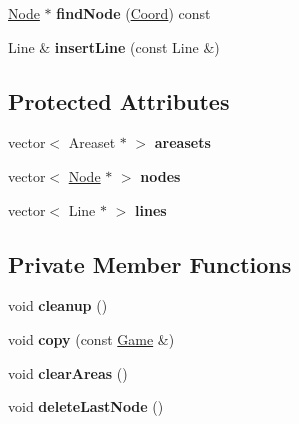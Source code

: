\begin{DoxyCompactItemize}
\item 
\hypertarget{classGame_a25d65e35ad5efbd14c4dbe4476bb5ec0}{\hyperlink{structNode}{Node} $\ast$ {\bfseries find\+Node} (\hyperlink{structCoord}{Coord}) const }\label{classGame_a25d65e35ad5efbd14c4dbe4476bb5ec0}

\item 
\hypertarget{classGame_a8698d31d2f9314753f392dbd9bb13b3c}{Line \& {\bfseries insert\+Line} (const Line \&)}\label{classGame_a8698d31d2f9314753f392dbd9bb13b3c}

\end{DoxyCompactItemize}
\subsection*{Protected Attributes}
\begin{DoxyCompactItemize}
\item 
\hypertarget{classGame_a1ab0295c1555fa04614de7644d9999c3}{vector$<$ Areaset $\ast$ $>$ {\bfseries areasets}}\label{classGame_a1ab0295c1555fa04614de7644d9999c3}

\item 
\hypertarget{classGame_a21787871b15141dcf1cafeacbd68bc8c}{vector$<$ \hyperlink{structNode}{Node} $\ast$ $>$ {\bfseries nodes}}\label{classGame_a21787871b15141dcf1cafeacbd68bc8c}

\item 
\hypertarget{classGame_acef1deb6e1ef97d367afaeb04af5226c}{vector$<$ Line $\ast$ $>$ {\bfseries lines}}\label{classGame_acef1deb6e1ef97d367afaeb04af5226c}

\end{DoxyCompactItemize}
\subsection*{Private Member Functions}
\begin{DoxyCompactItemize}
\item 
\hypertarget{classGame_a961f632fbe7f4ba08d23fe9edc7711be}{void {\bfseries cleanup} ()}\label{classGame_a961f632fbe7f4ba08d23fe9edc7711be}

\item 
\hypertarget{classGame_a6334d9f0e04044e0fb711f32fe4cfac4}{void {\bfseries copy} (const \hyperlink{classGame}{Game} \&)}\label{classGame_a6334d9f0e04044e0fb711f32fe4cfac4}

\item 
\hypertarget{classGame_a18db1f732aa95c4c6d78440b6d4d109b}{void {\bfseries clear\+Areas} ()}\label{classGame_a18db1f732aa95c4c6d78440b6d4d109b}

\item 
\hypertarget{classGame_a53b0e200e4727eb76ba1bbbd44164c76}{void {\bfseries delete\+Last\+Node} ()}\label{classGame_a53b0e200e4727eb76ba1bbbd44164c76}

\end{DoxyCompactItemize}
